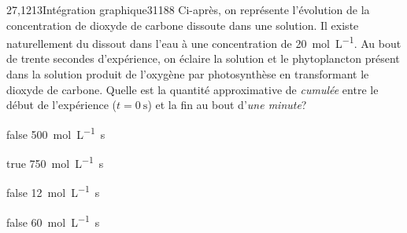 		\begin{question}{27,1213}{Intégration graphique}{3}{1188}
             Ci-après, on représente l'évolution de la concentration de dioxyde de carbone dissoute dans une solution. Il existe naturellement du  dissout dans l'eau à une concentration de \SI{20}{\mol\per\liter}. Au bout de trente secondes d'expérience, on éclaire la solution et le phytoplancton présent dans la solution produit de l'oxygène par photosynthèse en transformant le dioxyde de carbone. Quelle est la quantité approximative de  \emph{cumulée} entre le début de l'expérience ($t=\SI{0}{\second}$) et la fin au bout d'\emph{une minute}?
            \begin{figure}
             \end{figure}
        \end{question}
        \begin{reponses}
            \item[false] \SI{500}{\mol\per\liter.\second}
		    \item[true] \SI{750}{\mol\per\liter.\second}
		    \item[false] \SI{12}{\mol\per\liter.\second}
		    \item[false] \SI{60}{\mol\per\liter.\second}
		    \end{reponses}
